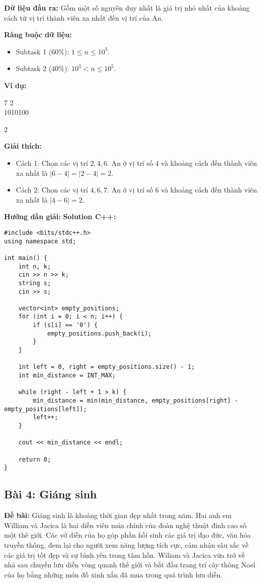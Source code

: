 \documentclass[12pt]{scrartcl}  %
\begin{document}
\textbf{Dữ liệu đầu ra:}
Gồm một số nguyên duy nhất là giá trị nhỏ nhất của khoảng cách từ vị trí thành viên xa nhất đến vị trí của An.

\textbf{Ràng buộc dữ liệu:}
\begin{itemize}
    \item Subtask 1 (60\%): $1 \leq n \leq 10^3$.
    \item Subtask 2 (40\%): $10^3 < n \leq 10^5$.
\end{itemize}

\textbf{Ví dụ:}
\begin{tcolorbox}[colback=gray!5!white, colframe=blue!50!black, title=Input]
7 2\\
1010100
\end{tcolorbox}
\begin{tcolorbox}[colback=gray!5!white, colframe=green!50!black, title=Output]
2
\end{tcolorbox}

\textbf{Giải thích:}
\begin{itemize}
    \item Cách 1: Chọn các vị trí $2, 4, 6$. An ở vị trí số $4$ và khoảng cách đến thành viên xa nhất là $|6 - 4| = |2 - 4| = 2$.
    \item Cách 2: Chọn các vị trí $4, 6, 7$. An ở vị trí số $6$ và khoảng cách đến thành viên xa nhất là $|4 - 6| = 2$.
\end{itemize}

\textbf{Hướng dẫn giải:}
\textbf{Solution C++:}
\begin{lstlisting}
#include <bits/stdc++.h>
using namespace std;

int main() {
    int n, k;
    cin >> n >> k;
    string s;
    cin >> s;

    vector<int> empty_positions;
    for (int i = 0; i < n; i++) {
        if (s[i] == '0') {
            empty_positions.push_back(i);
        }
    }

    int left = 0, right = empty_positions.size() - 1;
    int min_distance = INT_MAX;

    while (right - left + 1 > k) {
        min_distance = min(min_distance, empty_positions[right] - empty_positions[left]);
        left++;
    }

    cout << min_distance << endl;

    return 0;
}
\end{lstlisting}

\subsection{Bài 4: Giáng sinh}
\textbf{Đề bài:}
Giáng sinh là khoảng thời gian đẹp nhất trong năm. Hai anh em William và Jacica là hai diễn viên múa chính
của đoàn nghệ thuật đỉnh cao số một thế giới. Các vở diễn của họ góp phần hồi sinh các giá trị đạo đức, văn hóa truyền thông, 
đem lại cho người xem năng lượng tích cực, cảm nhận sâu sắc về các giá trị tốt đẹp và sự bình yên trong tâm hồn. 
Wiliam và Jacica vừa trở về nhà sau chuyến lưu diễn vòng quanh thế giới và bắt đầu trang trí cây thông Noel của họ bằng những món đồ xinh xắn đã mua trong quá trình lưu diễn.
\end{document}
